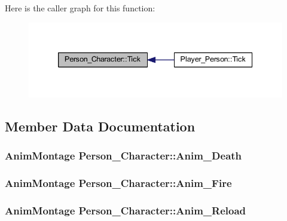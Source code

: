 Here is the caller graph for this function\+:\nopagebreak
\begin{figure}[H]
\begin{center}
\leavevmode
\includegraphics[width=339pt]{class_person___character_a49833f356173ccfe8857fcbc8e7cf2ad_icgraph}
\end{center}
\end{figure}




\subsection{Member Data Documentation}
\subsubsection[{\texorpdfstring{Anim\+\_\+\+Death}{Anim_Death}}]{\setlength{\rightskip}{0pt plus 5cm}Anim\+Montage Person\+\_\+\+Character\+::\+Anim\+\_\+\+Death}\hypertarget{class_person___character_a9e4810e11470421fc099e96537fa1de7}{}\label{class_person___character_a9e4810e11470421fc099e96537fa1de7}
\subsubsection[{\texorpdfstring{Anim\+\_\+\+Fire}{Anim_Fire}}]{\setlength{\rightskip}{0pt plus 5cm}Anim\+Montage Person\+\_\+\+Character\+::\+Anim\+\_\+\+Fire}\hypertarget{class_person___character_a226fe0bb104ba89be5c1eabfa3b7b74a}{}\label{class_person___character_a226fe0bb104ba89be5c1eabfa3b7b74a}
\subsubsection[{\texorpdfstring{Anim\+\_\+\+Reload}{Anim_Reload}}]{\setlength{\rightskip}{0pt plus 5cm}Anim\+Montage Person\+\_\+\+Character\+::\+Anim\+\_\+\+Reload}\hypertarget{class_person___character_aab5d72e6f9818ddea6da9517217851d9}{}\label{class_person___character_aab5d72e6f9818ddea6da9517217851d9}
